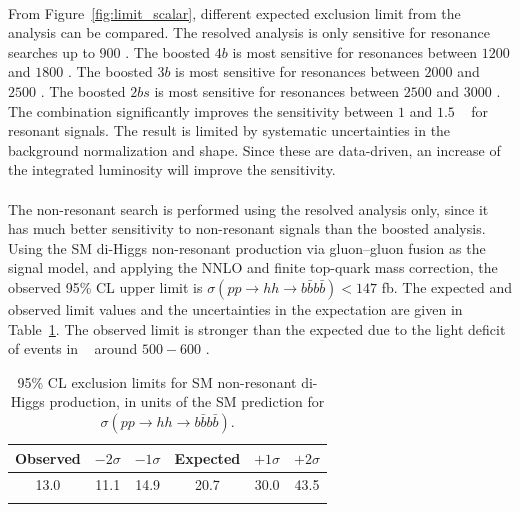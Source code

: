 \paragraph{}
From Figure~\ref{fig:limit_scalar}, different expected exclusion limit from the analysis can be compared.
The resolved analysis is only sensitive for resonance searches up to $900$ \GeV.
The boosted $4b$ is most sensitive for resonances between $1200$ and $1800$ \GeV.
The boosted $3b$ is most sensitive for resonances between $2000$ and $2500$ \GeV.
The boosted $2bs$ is most sensitive for resonances between $2500$ and $3000$ \GeV.
The combination significantly improves the sensitivity between $1$ and $1.5$ \TeV~ for resonant signals.                                                                                
The result is limited by systematic uncertainties in the background normalization and shape.
Since these are data-driven, an increase of the integrated luminosity will improve the sensitivity.

\paragraph{}
The non-resonant search is performed using the resolved analysis only, since it has much better sensitivity to non-resonant signals than the boosted analysis. 
Using the SM di-Higgs non-resonant production via gluon--gluon fusion as the signal model, and applying the NNLO and finite top-quark mass correction, the observed 95\% CL upper limit is $\sigma(pp\rightarrow hh \rightarrow b\bar{b}b\bar{b}) < 147$ fb. 
The expected and observed limit values and the uncertainties in the expectation are given in Table~\ref{tab:smrwMhhlims}.
The observed limit is stronger than the expected due to the light deficit of events in \mfourj~ around $500-600$ \GeV.

\begin{table}[htp]
\caption{95\% CL exclusion limits for SM non-resonant di-Higgs production, in units of the SM prediction for ${\sigma(pp\rightarrow hh \rightarrow b\bar{b}b\bar{b})}$.}
\begin{center}
\begin{tabular}{cccccc}
\toprule
Observed & $-2\sigma$ & $-1\sigma$ & Expected & $+1\sigma$ & $+2\sigma$ \\
\midrule
13.0 & 11.1 & 14.9 & 20.7 & 30.0 & 43.5 \\
\bottomrule
\label{tab:smrwMhhlims}
\end{tabular}
\end{center}
\end{table}

